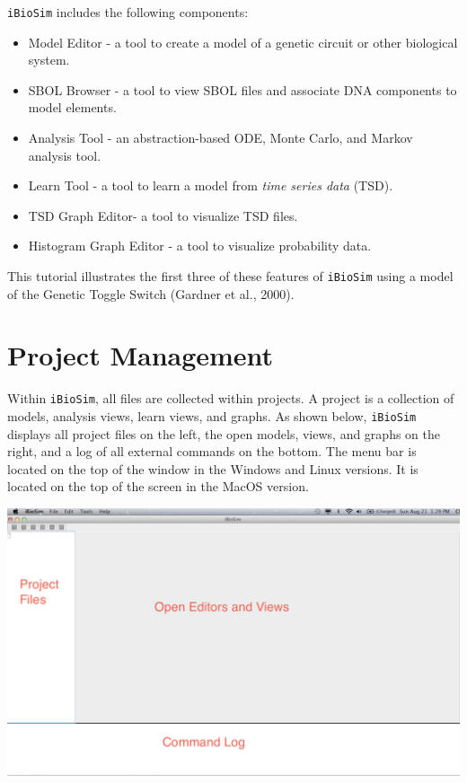 \documentclass[titlepage,11pt]{article}
\begin{document}
{\tt iBioSim} includes the following components: 

\begin{itemize}
\item Model Editor - a tool to create a model of a genetic circuit or other biological system.
\item SBOL Browser - a tool to view SBOL files and associate DNA components to model elements.
\item Analysis Tool - an abstraction-based ODE, Monte Carlo, and Markov analysis tool.
\item Learn Tool - a tool to learn a model from \emph{time series data} (TSD).
\item TSD Graph Editor- a tool to visualize TSD files. 
\item Histogram Graph Editor - a tool to visualize probability data. 
\end{itemize}

This tutorial illustrates the first three of these features of {\tt iBioSim} using a model of the Genetic Toggle Switch (Gardner et al., 2000).

\section{Project Management}

\noindent
Within {\tt iBioSim}, all files are collected within projects.   A project is a collection of models, analysis views, learn views, and graphs.  As shown below, {\tt iBioSim} displays all project files on the left, the open models, views, and graphs on the right, and a log of all external commands on the bottom.  The menu bar is located on the top of the window in the Windows and Linux versions.  It is located on the top of the screen in the MacOS version.

\begin{center}
\includegraphics[width=160mm]{screenshots/iBioSim}
\end{center}
\end{document}
